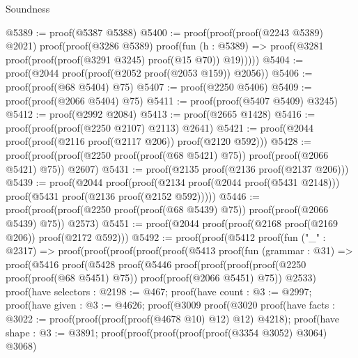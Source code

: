 \begin{lexlean}{Soundness}
\begin{coremodule}
@5389 := proof(@5387 @5388)
@5400 := proof(proof(proof(@2243 @5389) @2021)
      proof(proof(@3286 @5389)
          proof(fun (h : @5389) =>
            proof(@3281 proof(proof(proof(@3291 @3245) proof(@15 @70)) @19)))))
@5404 := proof(@2044 proof(proof(@2052 proof(@2053 @159)) @2056))
@5406 := proof(proof(@68 @5404) @75)
@5407 := proof(@2250 @5406)
@5409 := proof(proof(@2066 @5404) @75)
@5411 := proof(proof(@5407 @5409) @3245)
@5412 := proof(@2992 @2084)
@5413 := proof(@2665 @1428)
@5416 := proof(proof(proof(@2250 @2107) @2113) @2641)
@5421 := proof(@2044 proof(proof(@2116 proof(@2117 @206)) proof(@2120 @592)))
@5428 := proof(proof(proof(@2250 proof(proof(@68 @5421) @75)) proof(proof(@2066 @5421) @75)) @2607)
@5431 := proof(@2135 proof(@2136 proof(@2137 @206)))
@5439 := proof(@2044
      proof(proof(@2134 proof(@2044 proof(@5431 @2148)))
          proof(@5431 proof(@2136 proof(@2152 @592)))))
@5446 := proof(proof(proof(@2250 proof(proof(@68 @5439) @75)) proof(proof(@2066 @5439) @75)) @2573)
@5451 := proof(@2044 proof(proof(@2168 proof(@2169 @206)) proof(@2172 @592)))
@5492 := proof(proof(@5412
        proof(fun ("_" : @2317) =>
          proof(proof(proof(proof(proof(@5413
                      proof(fun (grammar : @31) =>
                        proof(@5416
                            proof(@5428
                                proof(@5446
                                    proof(proof(proof(proof(@2250 proof(proof(@68 @5451) @75))
                                            proof(proof(@2066 @5451) @75))
                                          @2533)
                                        proof(have selectors : @2198 := @467;
                                          proof(have count : @3 := @2997;
                                            proof(have given : @3 := @4626;
                                              proof(@3009
                                                  proof(@3020
                                                      proof(have facts : @3022 := proof(proof(proof(proof(@4678
                                                                  @10)
                                                                @12)
                                                              @12)
                                                            @4218);
                                                        proof(have shape : @3 := @3891;
                                                          proof(proof(proof(proof(proof(@3354 @3052)
                                                                    @3064)
                                                                  @3068)

\end{coremodule}
\end{lexlean}

